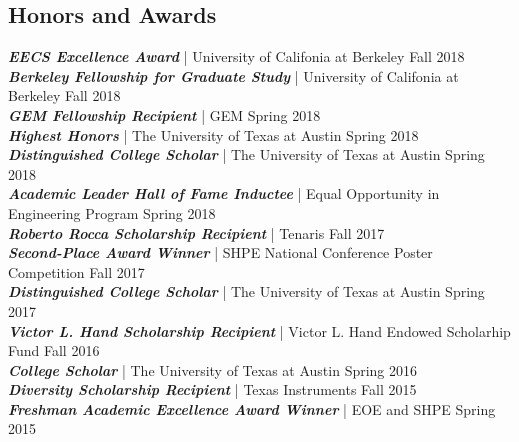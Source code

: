 \documentclass[letter]{res}
\begin{document}
\begin{resume}
\section{Honors and Awards}
{\sl \textbf{EECS Excellence Award}} | University of Califonia at Berkeley \hfill Fall 2018\\
{\sl \textbf{Berkeley Fellowship for Graduate Study}} | University of Califonia at Berkeley \hfill Fall 2018\\
{\sl \textbf{GEM Fellowship Recipient}} | GEM \hfill Spring 2018\\
{\sl \textbf{Highest Honors}} | The University of Texas at Austin  \hfill Spring 2018\\
{\sl \textbf{Distinguished College Scholar}} | The University of Texas at Austin  \hfill Spring 2018\\
{\sl \textbf{Academic Leader Hall of Fame Inductee}} | Equal Opportunity in Engineering Program  \hfill Spring 2018\\
{\sl \textbf{Roberto Rocca Scholarship Recipient}} | Tenaris \hfill Fall 2017\\
{\sl \textbf{Second-Place Award Winner}} | SHPE National Conference Poster Competition  \hfill Fall 2017\\
{\sl \textbf{Distinguished College Scholar}} | The University of Texas at Austin  \hfill Spring 2017\\
{\sl \textbf{Victor L. Hand Scholarship Recipient}} | Victor L. Hand Endowed Scholarhip Fund \hfill Fall 2016\\
{\sl \textbf{College Scholar}} | The University of Texas at Austin \hfill Spring 2016\\
{\sl \textbf{Diversity Scholarship Recipient}} | Texas Instruments \hfill Fall 2015\\
{\sl \textbf{Freshman Academic Excellence Award Winner}} | EOE and SHPE \hfill Spring 2015\\

\end{resume}
\end{document}
